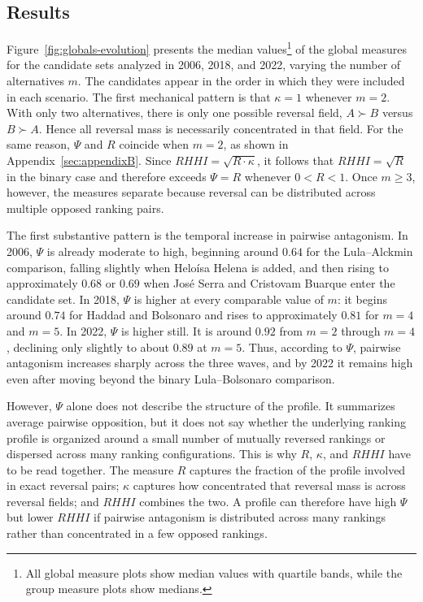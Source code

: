\documentclass[12pt]{article}
\begin{document}
\subsection{Results}

Figure~\ref{fig:globals-evolution} presents the median values\footnote{All global measure plots show median values with quartile bands, while the group measure plots show medians.} of the global measures for the candidate sets analyzed in 2006, 2018, and 2022, varying the number of alternatives \(m\). The candidates appear in the order in which they were included in each scenario. The first mechanical pattern is that \(\kappa=1\) whenever \(m=2\). With only two alternatives, there is only one possible reversal field, \(A \succ B\) versus \(B \succ A\). Hence all reversal mass is necessarily concentrated in that field. For the same reason, \(\Psi\) and \(R\) coincide when \(m=2\), as shown in Appendix~\ref{sec:appendixB}. Since \(RHHI=\sqrt{R\cdot \kappa}\), it follows that \(RHHI=\sqrt{R}\) in the binary case and therefore exceeds \(\Psi=R\) whenever \(0<R<1\). Once \(m\geq 3\), however, the measures separate because reversal can be distributed across multiple opposed ranking pairs.

The first substantive pattern is the temporal increase in pairwise antagonism. In 2006, \(\Psi\) is already moderate to high, beginning around \(0.64\) for the Lula--Alckmin comparison, falling slightly when Heloísa Helena is added, and then rising to approximately \(0.68\) or \(0.69\) when José Serra and Cristovam Buarque enter the candidate set. In 2018, \(\Psi\) is higher at every comparable value of \(m\): it begins around \(0.74\) for Haddad and Bolsonaro and rises to approximately \(0.81\) for \(m=4\) and \(m=5\). In 2022, \(\Psi\) is higher still. It is around \(0.92\) from \(m=2\) through \(m=4\), declining only slightly to about \(0.89\) at \(m=5\). Thus, according to \(\Psi\), pairwise antagonism increases sharply across the three waves, and by 2022 it remains high even after moving beyond the binary Lula--Bolsonaro comparison.

However, \(\Psi\) alone does not describe the structure of the profile. It summarizes average pairwise opposition, but it does not say whether the underlying ranking profile is organized around a small number of mutually reversed rankings or dispersed across many ranking configurations. This is why \(R\), \(\kappa\), and \(RHHI\) have to be read together. The measure \(R\) captures the fraction of the profile involved in exact reversal pairs; \(\kappa\) captures how concentrated that reversal mass is across reversal fields; and \(RHHI\) combines the two. A profile can therefore have high \(\Psi\) but lower \(RHHI\) if pairwise antagonism is distributed across many rankings rather than concentrated in a few opposed rankings.
\end{document}
